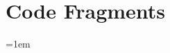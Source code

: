 \documentclass[
11pt, %
oneside, %
english, %
singlespacing, %
liststotoc, %
toctotoc, %
parskip, %
headsepline, %
]{MastersDoctoralThesis} %
\newcommand{\appendixinput}[1]{}
\begin{document}
\appendix

\chapter{Code Fragments}
\appendixinput{code.tex}


\emergencystretch=1em
\printbibliography[heading=bibintoc]

\end{document}
